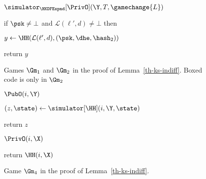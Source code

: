 \begin{figure}[tp]
\begin{minipage}[t]{0.49\textwidth}
\begin{oracle}{$\simulator_{\HKDFExpnd}[\PrivO](\Y, T, \gamechange{L})$}
			\item \quad if $\psk \neq \bot$ and $\mathcal{L}(\ell', d) \neq \bot$ then
			\item \quad \quad $y \gets \HH(\mathcal{L} (\ell', d), (\psk, \dhe,\hash_2))$
			\item return $y$
		\end{oracle}
	\end{minipage}
	\label{fig:gm12-ks-indiff}
	\caption{ Games $\Gm_1$ and $\Gm_2$ in the proof of Lemma~\ref{th-ks-indiff}. Boxed code is only in $\Gm_2$}
\end{figure}

\begin{figure}[tp]
	\begin{minipage}[t]{0.48\textwidth}
		\NewExperiment[Game $\Gm_4$]
	
		\begin{algorithm}{$\PubO(i,\Y)$}
			\item $(z,\state) \gets \simulator[\HH] (i,\Y,\state)$
			\item {}
			\item {}
			\item return $z$
		\end{algorithm}			
	\end{minipage}
	\begin{minipage}[t]{0.49\textwidth}
		\ExptSepSpace
	\begin{algorithm}{$\PrivO(i,\X)$}
	\item {}
	\item {}
	\item return $\HH(i,\X)$
\end{algorithm}	
\ExptSepSpace
\end{minipage}
\label{fig:gm4-ks-indiff}
\caption{ Game $\Gm_4$ in the proof of Lemma~\ref{th-ks-indiff}.}
\end{figure}



